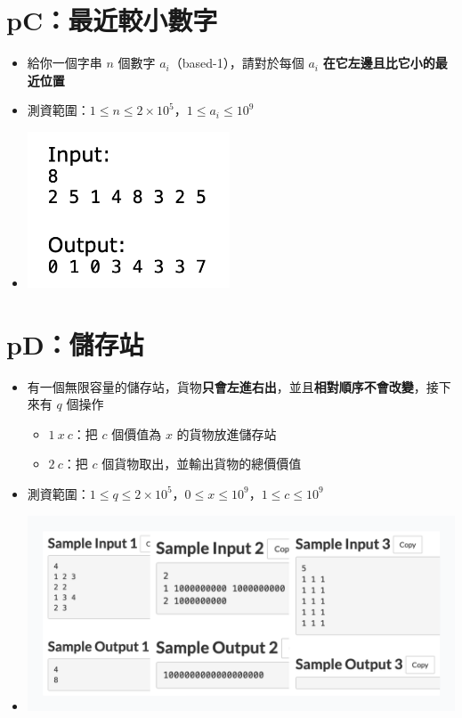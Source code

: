 \documentclass[12pt]{article}
\begin{document}
\pagebreak

\section*{pC：最近較小數字}

\begin{itemize}[label={}, itemsep=0pt]
    \item 給你一個字串 $n$ 個數字 $a_i$（based-1），請對於每個 $a_i$ \textbf{在它左邊且比它小的最近位置}
    \item 測資範圍：$1 \leq n \leq 2 \times 10^5$，$1 \leq a_i \leq 10^9$
    \item \begin{center}\includegraphics[width=6.0cm]{img/pC}\end{center}
\end{itemize}

\section*{pD：儲存站}

\begin{itemize}[label={}, itemsep=0pt]
    \item 有一個無限容量的儲存站，貨物\textbf{只會左進右出}，並且\textbf{相對順序不會改變}，接下來有 $q$ 個操作
    \begin{itemize}[label={-}, itemsep=0pt]
        \item $1\ x\ c$：把 $c$ 個價值為 $x$ 的貨物放進儲存站
        \item $2\ c$：把 $c$ 個貨物取出，並輸出貨物的總價價值
    \end{itemize}
    \item 測資範圍：$1 \leq q \leq 2 \times 10^5$，$0 \leq x \leq 10^9$，$1 \leq c \leq 10^9$
    \item \begin{center}\includegraphics[width=18.0cm]{img/pD}\end{center}
\end{itemize}
\end{document}

